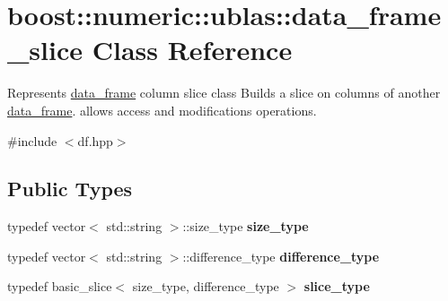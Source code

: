\hypertarget{classboost_1_1numeric_1_1ublas_1_1data__frame__slice}{}\section{boost\+:\+:numeric\+:\+:ublas\+:\+:data\+\_\+frame\+\_\+slice Class Reference}
\label{classboost_1_1numeric_1_1ublas_1_1data__frame__slice}


Represents \hyperlink{classboost_1_1numeric_1_1ublas_1_1data__frame}{data\+\_\+frame} column slice class Builds a slice on columns of another \hyperlink{classboost_1_1numeric_1_1ublas_1_1data__frame}{data\+\_\+frame}. allows access and modifications operations.  




{\ttfamily \#include $<$df.\+hpp$>$}

\subsection*{Public Types}
\begin{DoxyCompactItemize}
\item 
typedef vector$<$ std\+::string $>$\+::size\+\_\+type {\bfseries size\+\_\+type}\hypertarget{classboost_1_1numeric_1_1ublas_1_1data__frame__slice_a64882afbb9ec95de2ba7b7f2c67c6549}{}\label{classboost_1_1numeric_1_1ublas_1_1data__frame__slice_a64882afbb9ec95de2ba7b7f2c67c6549}

\item 
typedef vector$<$ std\+::string $>$\+::difference\+\_\+type {\bfseries difference\+\_\+type}\hypertarget{classboost_1_1numeric_1_1ublas_1_1data__frame__slice_ab8da22e0f4069692d24bc0269f7d8281}{}\label{classboost_1_1numeric_1_1ublas_1_1data__frame__slice_ab8da22e0f4069692d24bc0269f7d8281}

\item 
typedef basic\+\_\+slice$<$ size\+\_\+type, difference\+\_\+type $>$ {\bfseries slice\+\_\+type}\hypertarget{classboost_1_1numeric_1_1ublas_1_1data__frame__slice_a218c8259c584054d643724fd8f74450c}{}\label{classboost_1_1numeric_1_1ublas_1_1data__frame__slice_a218c8259c584054d643724fd8f74450c}

\end{DoxyCompactItemize}
